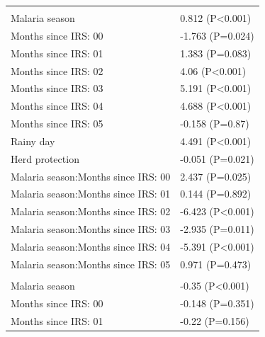 \documentclass[]{article}
\begin{document}
\begin{longtable}[t]{ll}
\addlinespace[1.5em]
\multicolumn{2}{l}{\textbf{Permanent not field worker}}\\
\hspace{1em}Malaria season & 0.812 (P<0.001)\\
\hspace{1em}Months since IRS: 00 & -1.763 (P=0.024)\\
\hspace{1em}Months since IRS: 01 & 1.383 (P=0.083)\\
\hspace{1em}Months since IRS: 02 & 4.06 (P<0.001)\\
\hspace{1em}Months since IRS: 03 & 5.191 (P<0.001)\\
\hspace{1em}Months since IRS: 04 & 4.688 (P<0.001)\\
\hspace{1em}Months since IRS: 05 & -0.158 (P=0.87)\\
\hspace{1em}Rainy day & 4.491 (P<0.001)\\
\hspace{1em}Herd protection & -0.051 (P=0.021)\\
\hspace{1em}Malaria season:Months since IRS: 00 & 2.437 (P=0.025)\\
\hspace{1em}Malaria season:Months since IRS: 01 & 0.144 (P=0.892)\\
\hspace{1em}Malaria season:Months since IRS: 02 & -6.423 (P<0.001)\\
\hspace{1em}Malaria season:Months since IRS: 03 & -2.935 (P=0.011)\\
\hspace{1em}Malaria season:Months since IRS: 04 & -5.391 (P<0.001)\\
\hspace{1em}Malaria season:Months since IRS: 05 & 0.971 (P=0.473)\\
\addlinespace[1.5em]
\multicolumn{2}{l}{\textbf{Temporary field worker}}\\
\hspace{1em}Malaria season & -0.35 (P<0.001)\\
\hspace{1em}Months since IRS: 00 & -0.148 (P=0.351)\\
\hspace{1em}Months since IRS: 01 & -0.22 (P=0.156)\\

\end{longtable}
\end{document}
